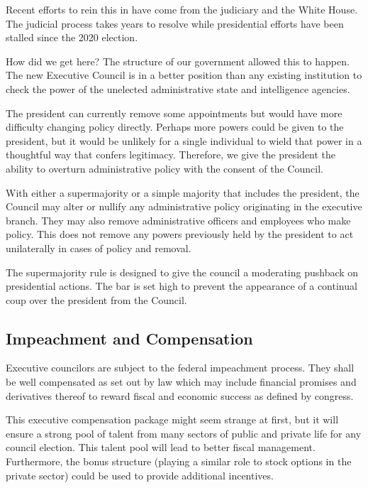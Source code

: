 \documentclass{article}
\begin{document}
Recent efforts to rein this in have come from the judiciary\cite{Crowell} and the White House\cite{ScheduleF}. The judicial process takes years to resolve while presidential efforts have been stalled since the 2020 election.

How did we get here? The structure of our government allowed this to happen. The new Executive Council is in a better position than any existing institution to check the power of the unelected administrative state and intelligence agencies.

The president can currently remove some appointments but would have more difficulty changing policy directly\cite{Fairlie}. Perhaps more powers could be given to the president, but it would be unlikely for a single individual to wield that power in a thoughtful way that confers legitimacy. Therefore, we give the president the ability to overturn administrative policy with the consent of the Council.

\begin{quoting}
With either a supermajority or a simple majority that includes the president, the Council may alter or nullify any administrative policy originating in the executive branch. They may also remove administrative officers and employees who make policy. This does not remove any powers previously held by the president to act unilaterally in cases of policy and removal.
\end{quoting}

The supermajority rule is designed to give the council a moderating pushback on presidential actions. The bar is set high to prevent the appearance of a continual coup over the president from the Council.

\subsection{Impeachment and Compensation}

\begin{quoting}
Executive councilors are subject to the federal impeachment process. They shall be well compensated as set out by law which may include financial promises and derivatives thereof to reward fiscal and economic success as defined by congress.
\end{quoting}

This executive compensation package might seem strange at first, but it will ensure a strong pool of talent from many sectors of public and private life for any council election. This talent pool will lead to better fiscal management\cite{Sowell}. Furthermore, the bonus structure (playing a similar role to stock options in the private sector) could be used to provide additional incentives.
\end{document}

